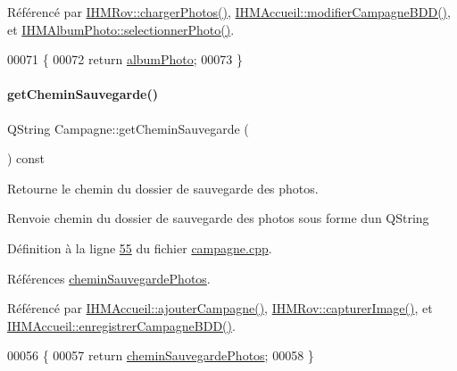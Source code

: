 Référencé par \hyperlink{ihmrov_8cpp_source_l00223}{I\+H\+M\+Rov\+::charger\+Photos()}, \hyperlink{ihmaccueil_8cpp_source_l00295}{I\+H\+M\+Accueil\+::modifier\+Campagne\+B\+D\+D()}, et \hyperlink{ihmalbumphoto_8cpp_source_l00081}{I\+H\+M\+Album\+Photo\+::selectionner\+Photo()}.


\begin{DoxyCode}
00071 \{
00072     \textcolor{keywordflow}{return} \hyperlink{class_campagne_a4d1fc7d4dbf10868a297fe3df7f08dbf}{albumPhoto};
00073 \}
\end{DoxyCode}
\mbox{\label{class_campagne_ad752790357417d83a93056d9c9689a16}} 
\paragraph{\texorpdfstring{get\+Chemin\+Sauvegarde()}{getCheminSauvegarde()}}
{\footnotesize\ttfamily Q\+String Campagne\+::get\+Chemin\+Sauvegarde (\begin{DoxyParamCaption}{ }\end{DoxyParamCaption}) const}



Retourne le chemin du dossier de sauvegarde des photos. 

\begin{DoxyReturn}{Renvoie}
chemin du dossier de sauvegarde des photos sous forme d\textquotesingle{}un Q\+String 
\end{DoxyReturn}


Définition à la ligne \hyperlink{campagne_8cpp_source_l00055}{55} du fichier \hyperlink{campagne_8cpp_source}{campagne.\+cpp}.



Références \hyperlink{campagne_8h_source_l00043}{chemin\+Sauvegarde\+Photos}.



Référencé par \hyperlink{ihmaccueil_8cpp_source_l00254}{I\+H\+M\+Accueil\+::ajouter\+Campagne()}, \hyperlink{ihmrov_8cpp_source_l00179}{I\+H\+M\+Rov\+::capturer\+Image()}, et \hyperlink{ihmaccueil_8cpp_source_l00273}{I\+H\+M\+Accueil\+::enregistrer\+Campagne\+B\+D\+D()}.


\begin{DoxyCode}
00056 \{
00057     \textcolor{keywordflow}{return} \hyperlink{class_campagne_a95484d0782021bc30157669d16c42208}{cheminSauvegardePhotos};
00058 \}
\end{DoxyCode}
\mbox{\label{class_campagne_a319b5bb4ed2b0fc1a10fc4d099a7a6d2}} 
